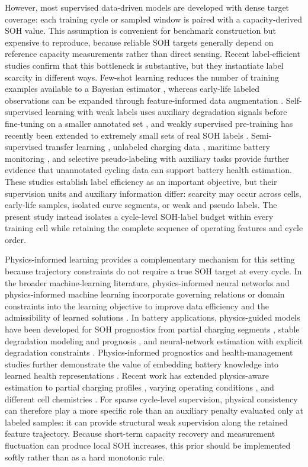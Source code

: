 \documentclass[a4paper,fleqn]{cas-dc}
\begin{document}
However, most supervised data-driven models are developed with dense target coverage: each training cycle or sampled window is paired with a capacity-derived SOH value. This assumption is convenient for benchmark construction but expensive to reproduce, because reliable SOH targets generally depend on reference capacity measurements rather than direct sensing. Recent label-efficient studies confirm that this bottleneck is substantive, but they instantiate label scarcity in different ways. Few-shot learning reduces the number of training examples available to a Bayesian estimator \cite{zhang2023fewshot}, whereas early-life labeled observations can be expanded through feature-informed data augmentation \cite{han2024limited}. Self-supervised learning with weak labels uses auxiliary degradation signals before fine-tuning on a smaller annotated set \cite{wang2024weaklabels}, and weakly supervised pre-training has recently been extended to extremely small sets of real SOH labels \cite{qian2026minimal}. Semi-supervised transfer learning \cite{li2020state}, unlabeled charging data \cite{lin2023improving}, maritime battery monitoring \cite{salucci2023novel}, and selective pseudo-labeling with auxiliary tasks \cite{li2026auxiliary} provide further evidence that unannotated cycling data can support battery health estimation. These studies establish label efficiency as an important objective, but their supervision units and auxiliary information differ: scarcity may occur across cells, early-life samples, isolated curve segments, or weak and pseudo labels. The present study instead isolates a cycle-level SOH-label budget within every training cell while retaining the complete sequence of operating features and cycle order.

Physics-informed learning provides a complementary mechanism for this setting because trajectory constraints do not require a true SOH target at every cycle. In the broader machine-learning literature, physics-informed neural networks and physics-informed machine learning incorporate governing relations or domain constraints into the learning objective to improve data efficiency and the admissibility of learned solutions \cite{raissi2019physics,karniadakis2021physics}. In battery applications, physics-guided models have been developed for SOH prognostics from partial charging segments \cite{kohtz2022physics}, stable degradation modeling and prognosis \cite{wang2024physics}, and neural-network estimation with explicit degradation constraints \cite{ye2024method}. Physics-informed prognostics and health-management studies further demonstrate the value of embedding battery knowledge into learned health representations \cite{wen2023physics}. Recent work has extended physics-aware estimation to partial charging profiles \cite{gu2026real}, varying operating conditions \cite{lin2025physics}, and different cell chemistries \cite{lin2025lightweight}. For sparse cycle-level supervision, physical consistency can therefore play a more specific role than an auxiliary penalty evaluated only at labeled samples: it can provide structural weak supervision along the retained feature trajectory. Because short-term capacity recovery and measurement fluctuation can produce local SOH increases, this prior should be implemented softly rather than as a hard monotonic rule.
\end{document}
